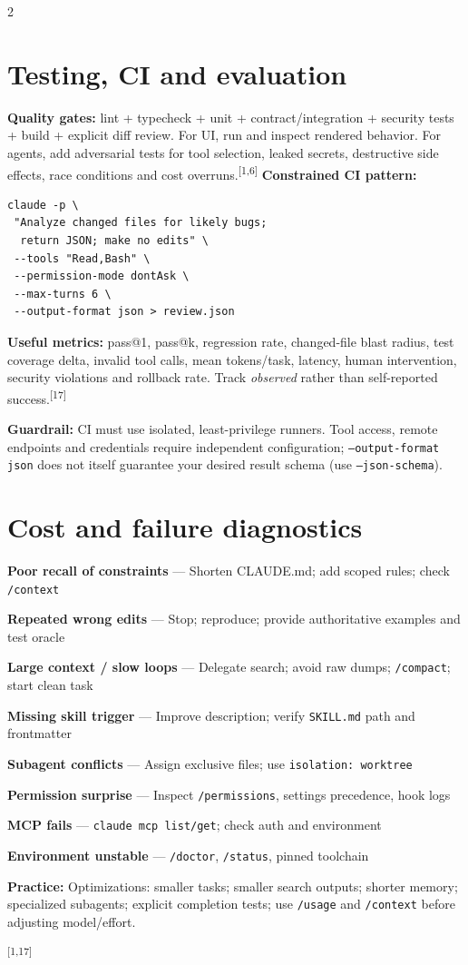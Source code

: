 \documentclass[9pt,a4paper]{extarticle}
\newcommand{\kw}[1]{\textbf{\color{navy}#1}}
\newcommand{\cmd}[1]{{\footnotesize\color{navy}\texttt{#1}}}
\newcommand{\src}[1]{\textsuperscript{\color{blue}[#1]}}
\newcommand{\tip}[1]{\par\textbf{\color{teal}Practice:} #1\par}
\newcommand{\warn}[1]{\par\textbf{\color{amber}Guardrail:} #1\par}
\newenvironment{tablist}{\begin{list}{}{\setlength{\leftmargin}{0pt}\setlength{\rightmargin}{0pt}\setlength{\itemindent}{0pt}\setlength{\itemsep}{1.4pt}\setlength{\parsep}{0pt}\setlength{\topsep}{2pt}}\fontsize{7.7}{9.3}\selectfont}{\end{list}}
\newcommand{\trow}[2]{\item \textbf{\color{navy}#1} \textcolor{slate}{---} #2}
\begin{document}
\begin{multicols}{2}
\section{Testing, CI and evaluation}
\kw{Quality gates:} lint + typecheck + unit + contract/integration + security tests + build + explicit diff review. For UI, run and inspect rendered behavior. For agents, add adversarial tests for tool selection, leaked secrets, destructive side effects, race conditions and cost overruns.\src{1,6}
\kw{Constrained CI pattern:}
\begin{lstlisting}
claude -p \
 "Analyze changed files for likely bugs;
  return JSON; make no edits" \
 --tools "Read,Bash" \
 --permission-mode dontAsk \
 --max-turns 6 \
 --output-format json > review.json
\end{lstlisting}
\kw{Useful metrics:} pass@1, pass@k, regression rate, changed-file blast radius, test coverage delta, invalid tool calls, mean tokens/task, latency, human intervention, security violations and rollback rate. Track \emph{observed} rather than self-reported success.\src{17}
\warn{CI must use isolated, least-privilege runners. Tool access, remote endpoints and credentials require independent configuration; \cmd{--output-format json} does not itself guarantee your desired result schema (use \cmd{--json-schema}).}

\section{Cost and failure diagnostics}
\begin{tablist}
\trow{Poor recall of constraints}{Shorten CLAUDE.md; add scoped rules; check \cmd{/context}}
\trow{Repeated wrong edits}{Stop; reproduce; provide authoritative examples and test oracle}
\trow{Large context / slow loops}{Delegate search; avoid raw dumps; \cmd{/compact}; start clean task}
\trow{Missing skill trigger}{Improve description; verify \cmd{SKILL.md} path and frontmatter}
\trow{Subagent conflicts}{Assign exclusive files; use \cmd{isolation: worktree}}
\trow{Permission surprise}{Inspect \cmd{/permissions}, settings precedence, hook logs}
\trow{MCP fails}{\cmd{claude mcp list/get}; check auth and environment}
\trow{Environment unstable}{\cmd{/doctor}, \cmd{/status}, pinned toolchain}
\end{tablist}
\tip{Optimizations: smaller tasks; smaller search outputs; shorter memory; specialized subagents; explicit completion tests; use \cmd{/usage} and \cmd{/context} before adjusting model/effort.}\src{1,17}


\end{multicols}
\end{document}
